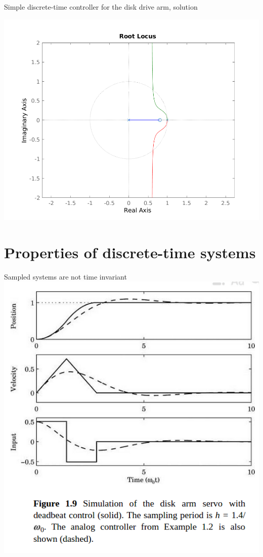 \documentclass[presentation,aspectratio=1610]{beamer}
\begin{document}
\begin{frame}[label={sec:org5c63bde}]{Simple discrete-time controller for the disk drive arm, solution}
\begin{center}
\includegraphics[width=0.8\linewidth]{rlocus-disk-arm.discrete}
\end{center}
\end{frame}


\section{Properties of discrete-time systems}
\label{sec:org825f393}

\begin{frame}[label={sec:org1aa886f}]{Sampled systems are \alert{not} time invariant}
\includegraphics[height=0.6\linewidth]{../../figures/fig1-9.png}
\end{frame}
\end{document}
